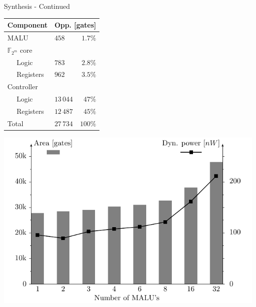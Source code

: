 \documentclass[svgnames]{beamer}
\newenvironment{changemargin}[2]{%
\begin{list}{}{%
\setlength{\topsep}{0pt}%
\setlength{\leftmargin}{#1}%
\setlength{\rightmargin}{#2}%
\setlength{\listparindent}{\parindent}%
\setlength{\itemindent}{\parindent}%
\setlength{\parsep}{\parskip}%
}%
\item[]}{\end{list}}
\begin{document}
\begin{frame}{Synthesis - Continued}
\vfill
	\begin{center}
	\begin{changemargin}{-0.3cm}{-0.8cm}
		\begin{minipage}[c]{0.3\paperwidth}
			\tiny{\begin{tabular}{llr}
				\toprule
				Component					& \multicolumn{2}{c}{Opp. [gates]}\\
				\midrule
				MALU				 			& $458$		& $1.7\%$\\
				$\mathbb{F}_{2^m}$ core	&				& \\
				$\quad$ Logic				& $783$		& $2.8\%$\\
				$\quad$ Registers			& $962$		& $3.5\%$\\
				Controller					&				& \\
				$\quad$ Logic				& $13\,044$	& $47\%$\\
				$\quad$ Registers			& $12\,487$	& $45\%$\\
				\midrule
				Total						& $27\,734$	& $100\%$\\
				\bottomrule		
			\end{tabular}}
		\end{minipage}
		\hfill
		\begin{minipage}{0.60\paperwidth}
			\includegraphics[width=0.60\paperwidth]{images/results-md-en}
		\end{minipage}		
	\end{changemargin}
	\end{center}
\vfill
\end{frame}
\end{document}
